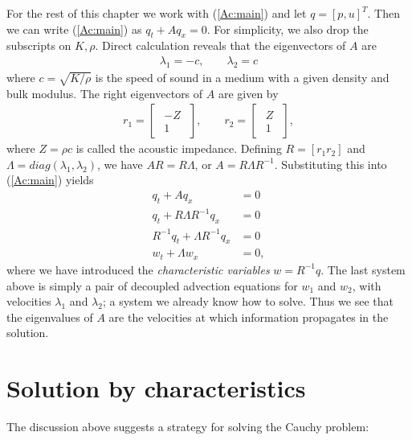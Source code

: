 \documentclass{SIAMbook2016}
\begin{document}
For the rest of this chapter we work with (\ref{Ac:main}) and let
\(q=[p,u]^T\). Then we can write (\ref{Ac:main}) as \(q_t + A q_x = 0\).
For simplicity, we also drop the subscripts on \(K, \rho\). Direct
calculation reveals that the eigenvectors of \(A\) are \begin{align}
\lambda_1 = -c, \qquad \lambda_2 = c
\end{align} where \(c=\sqrt{{K}/{\rho}}\) is the speed of sound in a
medium with a given density and bulk modulus. The right eigenvectors of
\(A\) are given by \begin{align*}
r_1 = \begin{bmatrix}\begin{array}{c}-Z\\1\end{array}\end{bmatrix}, \qquad r_2 = \begin{bmatrix}\begin{array}{c}Z\\1\end{array}\end{bmatrix},
\end{align*} where \(Z=\rho c\) is called the acoustic impedance.
Defining \(R = [r_1 r_2]\) and \(\Lambda = diag(\lambda_1, \lambda_2)\),
we have \(AR = R\Lambda\), or \(A = R \Lambda R^{-1}\). Substituting
this into (\ref{Ac:main}) yields \begin{align*}
q_t + A q_x & = 0 \\
q_t + R \Lambda R^{-1} q_x & = 0 \\
R^{-1}q_t + \Lambda R^{-1} q_x & = 0 \\
w_t + \Lambda w_x & = 0,
\end{align*} where we have introduced the \emph{characteristic
variables} \(w=R^{-1}q\). The last system above is simply a pair of
decoupled advection equations for \(w_1\) and \(w_2\), with velocities
\(\lambda_1\) and \(\lambda_2\); a system we already know how to solve.
Thus we see that the eigenvalues of \(A\) are the velocities at which
information propagates in the solution.

\hypertarget{solution-by-characteristics}{%
\section{Solution by
characteristics}\label{solution-by-characteristics}}

The discussion above suggests a strategy for solving the Cauchy problem:
\end{document}
